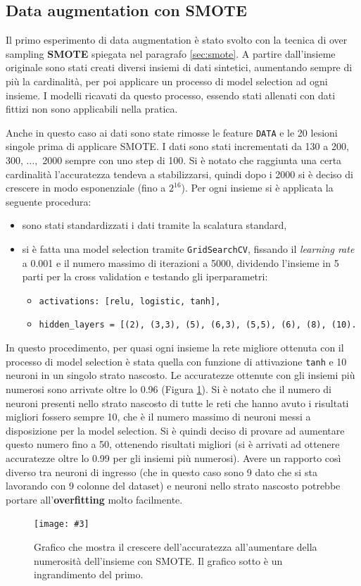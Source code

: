 \documentclass[12pt, twoside, letterpaper]{report}
\newcommand{\imgh}[4] {
	\begin{figure}[h]
		\centering
		\texttt{[image: \#3]}\\
		\caption{#1}
		\label{fig:#4}
	\end{figure}
}
\begin{document}
		\subsection{Data augmentation con SMOTE} \label{sec:data_aug_smote}
			Il primo esperimento di data augmentation è stato svolto con la tecnica di over sampling \textbf{SMOTE} spiegata nel paragrafo \ref{sec:smote}. A partire dall'insieme originale sono stati creati diversi insiemi di dati sintetici, aumentando sempre di più la cardinalità, per poi applicare un processo di model selection ad ogni insieme. I modelli ricavati da questo processo, essendo stati allenati con dati fittizi non sono applicabili nella pratica. 
			
			Anche in questo caso ai dati sono state rimosse le feature \texttt{DATA} e le 20 lesioni singole prima di applicare SMOTE. I dati sono stati incrementati da 130 a 200, 300, $\dots,$ 2000 sempre con uno step di 100. Si è notato che raggiunta una certa cardinalità l'accuratezza tendeva a stabilizzarsi, quindi dopo i 2000 si è deciso di crescere in modo esponenziale (fino a $2^{16}$). Per ogni insieme si è applicata la seguente procedura:
				\begin{itemize}
				 \item sono stati standardizzati i dati tramite la scalatura standard,
				 \item si è fatta una model selection tramite \texttt{GridSearchCV}, fissando il \textit{learning rate} a 0.001 e il numero massimo di iterazioni a 5000, dividendo l'insieme in 5 parti per la cross validation e testando gli iperparametri:
				 	\begin{itemize}
					\item \texttt{activations: [relu, logistic, tanh],}
    				\item \texttt{hidden\_layers = [(2), (3,3), (5), (6,3), (5,5), (6), (8), (10).}
					\end{itemize}
				 \end{itemize}
			In questo procedimento, per quasi ogni insieme la rete migliore ottenuta con il processo di model selection è stata quella con funzione di attivazione \texttt{tanh} e 10 neuroni in un singolo strato nascosto. Le accuratezze ottenute con gli insiemi più numerosi sono arrivate oltre lo 0.96 (Figura \ref{fig:accuracy_smote}). Si è notato che il numero di neuroni presenti nello strato nascosto di tutte le reti che hanno avuto i risultati migliori fossero sempre 10, che è il numero massimo di neuroni messi a disposizione per la model selection. Si è quindi deciso di provare ad aumentare questo numero fino a 50, ottenendo risultati migliori (si è arrivati ad ottenere accuratezze oltre lo 0.99 per gli insiemi più numerosi). Avere un rapporto così diverso tra neuroni di ingresso (che in questo caso sono 9 dato che si sta lavorando con 9 colonne del dataset) e neuroni nello strato nascosto potrebbe portare all'\textbf{overfitting} molto facilmente.
			\imgh{Grafico che mostra il crescere dell'accuratezza all'aumentare della numerosità dell'insieme con SMOTE. Il grafico sotto è un ingrandimento del primo.}{0.35}{accuracy_smote_1.png}{accuracy_smote}
			
\end{document}
